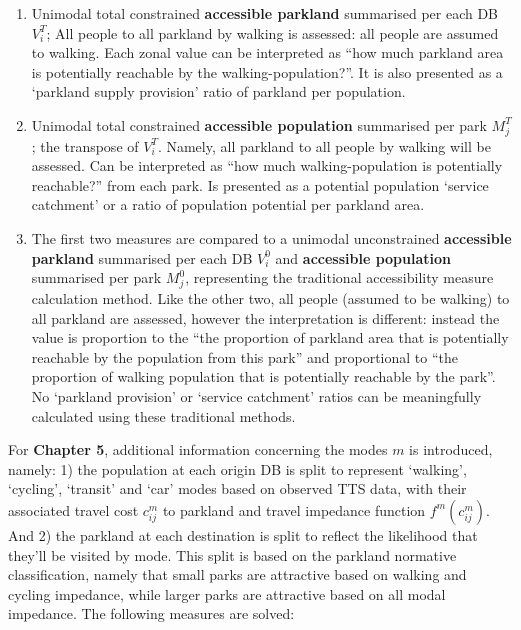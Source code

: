 \documentclass[
11pt, %
oneside, %
english, %
singlespacing, %
]{macthesis} %
\def\tightlist{}
\begin{document}
\begin{enumerate}
\def\labelenumi{\arabic{enumi}.}
\tightlist
\item
  Unimodal total constrained \textbf{accessible parkland} summarised per each DB \(V_i^T\); All people to all parkland by walking is assessed: all people are assumed to walking. Each zonal value can be interpreted as ``how much parkland area is potentially reachable by the walking-population?''. It is also presented as a `parkland supply provision' ratio of parkland per population.
\item
  Unimodal total constrained \textbf{accessible population} summarised per park \(M_j^T\); the transpose of \(V_i^T\). Namely, all parkland to all people by walking will be assessed. Can be interpreted as ``how much walking-population is potentially reachable?'' from each park. Is presented as a potential population `service catchment' or a ratio of population potential per parkland area.
\item
  The first two measures are compared to a unimodal unconstrained \textbf{accessible parkland} summarised per each DB \(V_i^0\) and \textbf{accessible population} summarised per park \(M_j^0\), representing the traditional accessibility measure calculation method. Like the other two, all people (assumed to be walking) to all parkland are assessed, however the interpretation is different: instead the value is proportion to the ``the proportion of parkland area that is potentially reachable by the population from this park'' and proportional to ``the proportion of walking population that is potentially reachable by the park''. No `parkland provision' or `service catchment' ratios can be meaningfully calculated using these traditional methods.
\end{enumerate}

For \textbf{Chapter 5}, additional information concerning the modes \(m\) is introduced, namely: 1) the population at each origin DB is split to represent `walking', `cycling', `transit' and `car' modes based on observed TTS data, with their associated travel cost \(c_{ij}^m\) to parkland and travel impedance function \(f^m (c^m_{ij})\). And 2) the parkland at each destination is split to reflect the likelihood that they'll be visited by mode. This split is based on the parkland normative classification, namely that small parks are attractive based on walking and cycling impedance, while larger parks are attractive based on all modal impedance. The following measures are solved:
\end{document}
